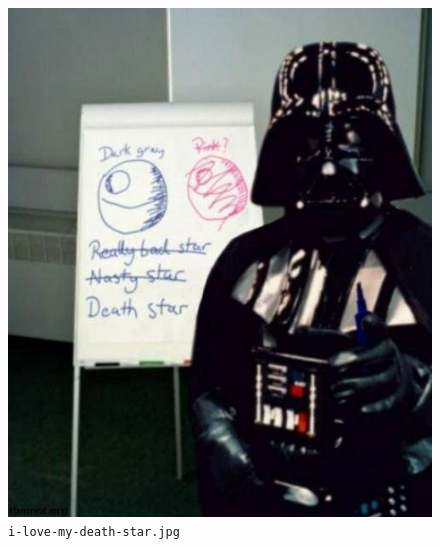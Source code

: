 \documentclass{article}
\begin{document}
\begin{appendices}
\begin{figure}[H]
	\includegraphics[width=\linewidth]{resources/plans/i-love-my-death-star.jpg}
	\caption{\texttt{i-love-my-death-star.jpg}}
	\label{fig:i_love_my_death_star}
\end{figure}


\end{appendices}
\end{document}

